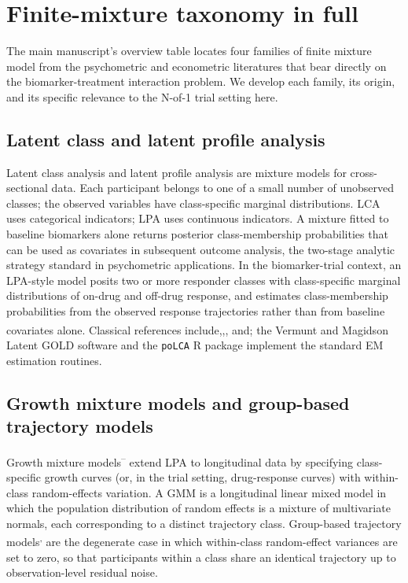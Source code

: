 \documentclass[
  11pt,
]{article}
\begin{document}
\section{Finite-mixture taxonomy in full}\label{finite-mixture-taxonomy-in-full}

The main manuscript's overview table locates four families of finite
mixture model from the psychometric and econometric literatures that
bear directly on the biomarker-treatment interaction problem. We
develop each family, its origin, and its specific relevance to the
N-of-1 trial setting here.

\subsection{Latent class and latent profile analysis}\label{latent-class-and-latent-profile-analysis}

Latent class analysis and latent profile analysis are mixture models
for cross-sectional data. Each participant belongs to one of a small
number of unobserved classes; the observed variables have
class-specific marginal distributions. LCA uses categorical indicators;
LPA uses continuous indicators. A mixture fitted to baseline biomarkers
alone returns posterior class-membership probabilities that can be used
as covariates in subsequent outcome analysis, the two-stage analytic
strategy standard in psychometric applications. In the biomarker-trial
context, an LPA-style model posits two or more responder classes with
class-specific marginal distributions of on-drug and off-drug response,
and estimates class-membership probabilities from the observed response
trajectories rather than from baseline covariates alone. Classical
references include\textsuperscript{},\textsuperscript{},\textsuperscript{}, and\textsuperscript{}; the Vermunt and Magidson Latent GOLD software and
the \texttt{poLCA} R package implement the standard EM estimation
routines.

\subsection{Growth mixture models and group-based trajectory models}\label{growth-mixture-models-and-group-based-trajectory-models}

Growth mixture models\textsuperscript{--}
extend LPA to longitudinal data by specifying class-specific growth
curves (or, in the trial setting, drug-response curves) with
within-class random-effects variation. A GMM is a longitudinal linear
mixed model in which the population distribution of random effects is a
mixture of multivariate normals, each corresponding to a distinct
trajectory class. Group-based trajectory models\textsuperscript{,} are the degenerate case in which within-class
random-effect variances are set to zero, so that participants within a
class share an identical trajectory up to observation-level residual
noise.
\end{document}
